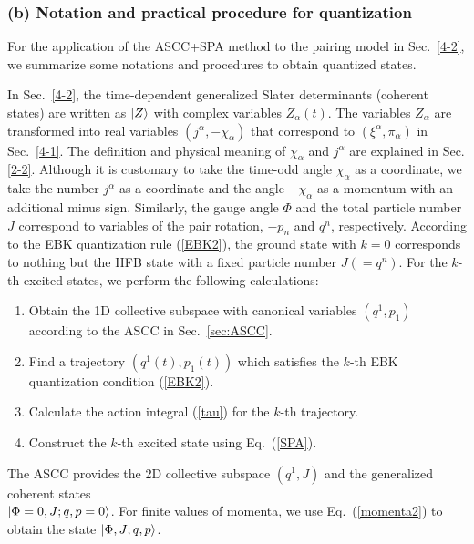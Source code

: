\documentclass[11pt]{book} %
\begin{document}
\subsubsection{(b) Notation and practical procedure for quantization}
\label{sec:notation}

For the application of the ASCC+SPA method to the pairing model in Sec.~\ref{4-2},
we summarize some notations and procedures to obtain quantized states.

In Sec.~\ref{4-2}, the time-dependent generalized Slater determinants
(coherent states) are written as $\ket{Z}$ with complex variables
$Z_\alpha(t)$.
The variables $Z_\alpha$ are transformed into real variables
$(j^\alpha, -\chi_\alpha)$ that correspond to $(\xi^\alpha,\pi_\alpha)$
in Sec.~\ref{4-1}.
The definition and physical meaning of $\chi_\alpha$ and $j^\alpha$ are explained in Sec. \ref{2-2}.
Although it is customary to take the time-odd angle $\chi_\alpha$ as a coordinate,
we take the number $j^\alpha$ as a coordinate and the angle $-\chi_\alpha$ as a momentum with an additional minus sign.
Similarly, the gauge angle $\Phi$ and the total particle number $J$
correspond to variables of the pair rotation, $-p_n$ and $q^n$, respectively.
According to the EBK quantization rule (\ref{EBK2}),
the ground state with $k=0$ corresponds to nothing but the HFB state
with a fixed particle number $J(=q^n)$.
For the $k$-th excited states, we perform the following calculations:
\begin{enumerate}
\item Obtain the 1D collective subspace with canonical variables $(q^1,p_1)$
	according to the ASCC in Sec.~\ref{sec:ASCC}.
\item Find a trajectory $(q^1(t),p_1(t))$ which satisfies
the $k$-th EBK quantization condition (\ref{EBK2}).
\item Calculate the action integral (\ref{tau}) for the $k$-th trajectory.
\item Construct the $k$-th excited state using Eq.~(\ref{SPA}).
\end{enumerate}
The ASCC provides the 2D collective subspace $(q^1,J)$
and the generalized coherent states \\
$\ket{\Phi=0,J;q,p=0}$.
For finite values of momenta, we use Eq.~(\ref{momenta2})
to obtain the state $\ket{\Phi,J;q,p}$.
\end{document}
